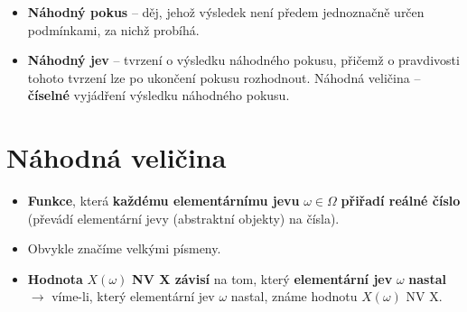 \begin{itemize}
    \item \textbf{Náhodný pokus} -- děj, jehož výsledek není předem jednoznačně určen podmínkami, za nichž probíhá.
    \item \textbf{Náhodný jev} -- tvrzení o výsledku náhodného pokusu, přičemž o pravdivosti tohoto tvrzení lze po ukončení pokusu rozhodnout.
          Náhodná veličina  -- \textbf{číselné} vyjádření výsledku náhodného pokusu.
\end{itemize}

\section{Náhodná veličina}
\begin{itemize}
    \item \textbf{Funkce}, která \textbf{každému elementárnímu jevu} $\omega \in \Omega$ \textbf{přiřadí reálné číslo} (převádí elementární jevy (abstraktní objekty) na čísla).
    \item Obvykle značíme velkými písmeny.
    \item \textbf{Hodnota} $X(\omega)$ \textbf{NV X závisí} na tom, který \textbf{elementární jev} $\omega$ \textbf{nastal} $\rightarrow$ víme-li, který elementární jev $\omega$ nastal, známe hodnotu $X(\omega)$ NV X.
\end{itemize}
